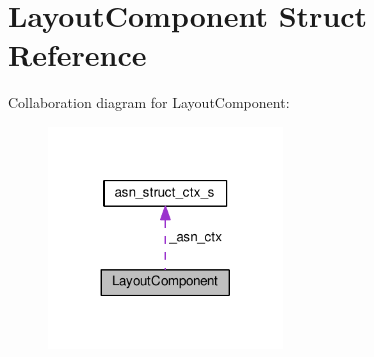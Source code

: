 \hypertarget{structLayoutComponent}{}\section{Layout\+Component Struct Reference}
\label{structLayoutComponent}


Collaboration diagram for Layout\+Component\+:\nopagebreak
\begin{figure}[H]
\begin{center}
\leavevmode
\includegraphics[width=176pt]{structLayoutComponent__coll__graph}
\end{center}
\end{figure}
